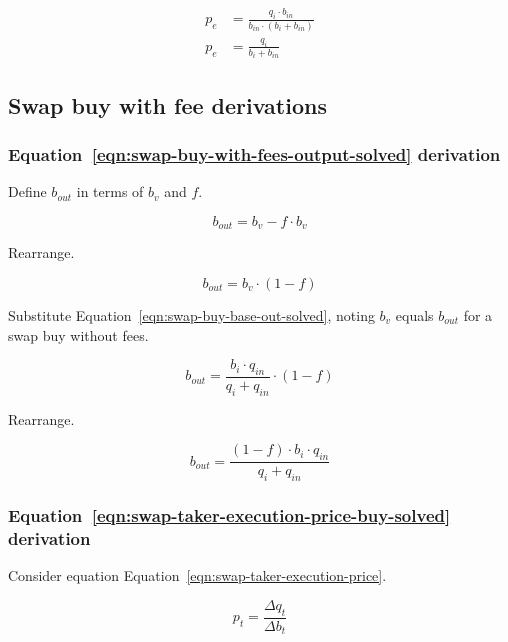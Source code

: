 \documentclass[table, twocolumn]{article}
\begin{document}
\begin{align}
	p_e & = \frac{q_i \cdot b_{in}}{b_{in} \cdot (b_i + b_{in})} \nonumber \\
	p_e & = \frac{q_i}{b_i + b_{in}} \nonumber
\end{align}

\subsection{Swap buy with fee  derivations}\label{ssec:swap-buy-with-fee-derivations}

\subsubsection{Equation~\ref{eqn:swap-buy-with-fees-output-solved} derivation}%

Define $b_{out}$ in terms of $b_v$ and $f$.

\begin{equation}
  b_{out} = b_v - f \cdot b_v \nonumber
\end{equation}

Rearrange.

\begin{equation}
  b_{out} = b_v \cdot (1 - f) \nonumber
\end{equation}

Substitute Equation~\ref{eqn:swap-buy-base-out-solved}, noting $b_v$ equals $b_{out}$
for a swap buy without fees.

\begin{equation}
  b_{out} = \frac{b_i \cdot q_{in}}{q_i + q_{in}} \cdot (1 - f) \nonumber
\end{equation}

Rearrange.

\begin{equation}
  b_{out} = \frac{(1 - f) \cdot b_i \cdot q_{in}}{q_i + q_{in}} \nonumber
\end{equation}

\subsubsection{Equation~\ref{eqn:swap-taker-execution-price-buy-solved} derivation}%
\label{sssec:equation-eqn-swap-taker-execution-price-buy-solved-derivation}

Consider equation Equation~\ref{eqn:swap-taker-execution-price}.

\begin{equation}
  p_t = \frac{\Delta q_t}{\Delta b_t}
\end{equation}
\end{document}
